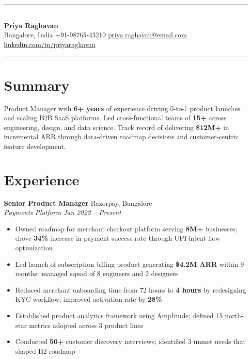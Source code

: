 \documentclass[10pt,a4paper]{article}
\newcommand{\metric}[1]{\textbf{\color{accent}#1}}
\begin{document}
{\color{accent}\rule{\textwidth}{3pt}}\\[6pt]
{\fontsize{20}{24}\selectfont\bfseries Priya Raghavan}\\[3pt]
{\small Bangalore, India \quad\textbar\quad +91-98765-43210 \quad\textbar\quad \href{mailto:priya.raghavan@email.com}{priya.raghavan@email.com} \quad\textbar\quad \href{https://linkedin.com/in/priyaraghavan}{linkedin.com/in/priyaraghavan}}\\[4pt]
{\color{accent}\rule{\textwidth}{0.5pt}}

\section{Summary}
Product Manager with \metric{6+ years} of experience driving 0-to-1 product launches and scaling B2B SaaS platforms. Led cross-functional teams of \metric{15+} across engineering, design, and data science. Track record of delivering \metric{\$12M+} in incremental ARR through data-driven roadmap decisions and customer-centric feature development.

\section{Experience}

\textbf{Senior Product Manager} \hfill Razorpay, Bangalore\\
\textit{Payments Platform} \hfill \textit{Jan 2022 -- Present}
\begin{itemize}
  \item Owned roadmap for merchant checkout platform serving \metric{8M+} businesses; drove \metric{34\%} increase in payment success rate through UPI intent flow optimization
  \item Led launch of subscription billing product generating \metric{\$4.2M ARR} within 9 months; managed squad of 8 engineers and 2 designers
  \item Reduced merchant onboarding time from 72 hours to \metric{4 hours} by redesigning KYC workflow; improved activation rate by \metric{28\%}
  \item Established product analytics framework using Amplitude; defined 15 north-star metrics adopted across 3 product lines
  \item Conducted \metric{50+} customer discovery interviews; identified 3 unmet needs that shaped H2 roadmap
\end{itemize}
\end{document}
